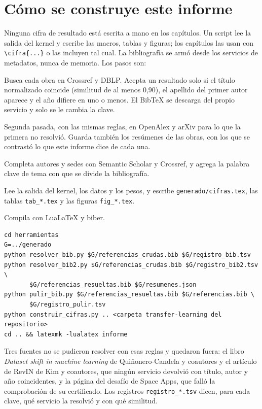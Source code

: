 \begin{table}[htbp]
\caption[Datos de entrada y pesos publicados]{Datos de entrada del kernel y pesos de Hugging Face usados en la
auditoría: sha256, primeros 16 caracteres.}
\label{tab:hashes}
\centering\small

\end{table}

\section{Cómo se construye este informe}

Ninguna cifra de resultado está escrita a mano en los capítulos. Un script lee la salida del kernel y escribe las
macros, tablas y figuras; los capítulos las usan con \verb|\cifra{...}| o las incluyen tal cual. La bibliografía se
armó desde los servicios de metadatos, nunca de memoria. Los pasos son:
\begin{description}[style=nextline, leftmargin=1.2em]
\item[\texttt{resolver\_bib.py}] Busca cada obra en Crossref y DBLP. Acepta un resultado solo si el título
  normalizado coincide (similitud de al menos 0,90), el apellido del primer autor aparece y el año difiere en uno o
  menos. El BibTeX se descarga del propio servicio y solo se le cambia la clave.
\item[\texttt{resolver\_bib2.py}] Segunda pasada, con las mismas reglas, en OpenAlex y arXiv para lo que la primera no
  resolvió. Guarda también los resúmenes de las obras, con los que se contrastó lo que este informe dice de cada una.
\item[\texttt{pulir\_bib.py}] Completa autores y sedes con Semantic Scholar y Crossref, y agrega la palabra clave de
  tema con que se divide la bibliografía.
\item[\texttt{construir\_cifras.py}] Lee la salida del kernel, los datos y los pesos, y escribe
  \texttt{generado/cifras.tex}, las tablas \texttt{tab\_*.tex} y las figuras \texttt{fig\_*.tex}.
\item[\texttt{latexmk}] Compila con Lua\LaTeX{} y biber.
\end{description}

\begin{lstlisting}[basicstyle=\ttfamily\footnotesize]
cd herramientas
G=../generado
python resolver_bib.py $G/referencias_crudas.bib $G/registro_bib.tsv
python resolver_bib2.py $G/referencias_crudas.bib $G/registro_bib2.tsv \
       $G/referencias_resueltas.bib $G/resumenes.json
python pulir_bib.py $G/referencias_resueltas.bib $G/referencias.bib \
       $G/registro_pulir.tsv
python construir_cifras.py .. <carpeta transfer-learning del repositorio>
cd .. && latexmk -lualatex informe
\end{lstlisting}

Tres fuentes no se pudieron resolver con esas reglas y quedaron fuera: el libro \emph{Dataset shift in machine
learning} de Quiñonero-Candela y coautores y el artículo de RevIN de Kim y coautores, que ningún servicio devolvió con
título, autor y año coincidentes, y la página del desafío de Space Apps, que falló la comprobación de su certificado. Los
registros \texttt{registro\_*.tsv} dicen, para cada clave, qué servicio la resolvió y con qué similitud.
